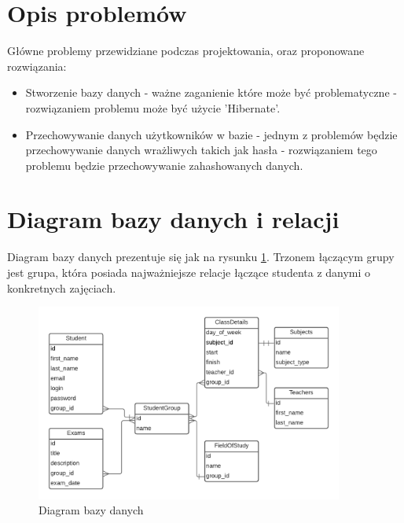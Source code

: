 \documentclass[a4paper,11pt]{uzreport}
\begin{document}
\section{Opis problemów}
	Główne problemy przewidziane podczas projektowania, oraz proponowane rozwiązania:

	\begin{itemize}[leftmargin=0.5in]

		\item Stworzenie bazy danych - ważne zaganienie które może być problematyczne - rozwiązaniem problemu może być użycie 'Hibernate'.
            
		\item Przechowywanie danych użytkowników w bazie - jednym z problemów będzie przechowywanie danych wrażliwych takich jak hasła - 			 			rozwiązaniem tego problemu będzie przechowywanie zahashowanych danych.
                
 	\end{itemize}

\section{Diagram bazy danych i relacji}

	Diagram bazy danych prezentuje się jak na rysunku \ref{diagram_bazy_danych}. Trzonem łączącym grupy jest grupa, która posiada najważniejsze relacje łączące studenta z danymi o konkretnych zajęciach.

    \begin{figure}[ht!]
        \centering
        \includegraphics[width=0.9\textwidth]{pictures/UZplaner-baza-danych.png}
        \caption{Diagram bazy danych}
        \label{diagram_bazy_danych}
     \end{figure}
\end{document}
